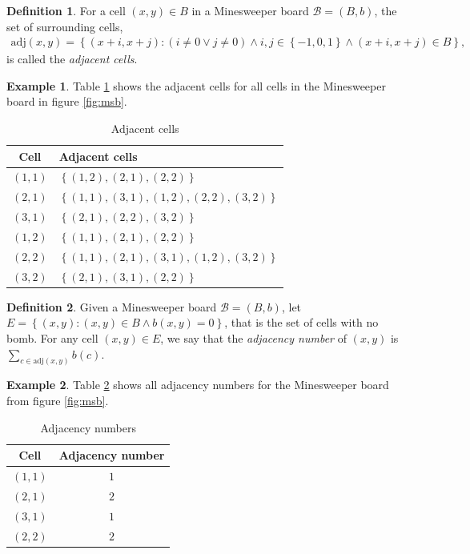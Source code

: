 \documentclass[11pt,a4paper,notitlepage]{article}
\newcommand{\set}[1]{\left\{#1\right\}} %
\theoremstyle{definition}
\newtheorem{example}{Example}[section]
\newtheorem{definition}{Definition}[section]
\begin{document}
\begin{definition}
For a cell $(x,y) \in B$ in a Minesweeper board $\mathcal{B} = (B,b)$, the set of surrounding cells,
\begin{align*}
\text{adj}(x,y) = \set{(x+i,x+j) : (i \neq 0 \vee j \neq 0) \wedge i,j \in \set{-1,0,1} \wedge (x+i,x+j) \in B},
\end{align*}
is called the \emph{adjacent cells}.
\end{definition}
\begin{example}
Table \ref{table:ac} shows the adjacent cells for all cells in the Minesweeper board in figure \ref{fig:msb}.
\begin{table}[H]
\begin{center}
\begin{tabular}{c|l}
Cell & Adjacent cells \\
\hline
$(1,1)$ & $\set{(1,2),(2,1),(2,2)}$ \\
$(2,1)$ & $\set{(1,1),(3,1),(1,2),(2,2),(3,2)}$ \\
$(3,1)$ & $\set{(2,1),(2,2),(3,2)}$ \\
$(1,2)$ & $\set{(1,1),(2,1),(2,2)}$ \\
$(2,2)$ & $\set{(1,1),(2,1),(3,1),(1,2),(3,2)}$ \\
$(3,2)$ & $\set{(2,1),(3,1),(2,2)}$
\end{tabular}
\end{center}
\caption{Adjacent cells}
\label{table:ac}
\end{table}
\end{example}

\begin{definition}
Given a Minesweeper board $\mathcal{B} = (B,b)$, let $E = \set{(x, y) : (x,y) \in B \wedge b(x,y) = 0}$, that is the set of cells with no bomb. For any cell $(x,y) \in E$, we say that the \emph{adjacency number} of $(x,y)$ is $\sum_{c \in \text{adj}(x,y)}b(c)$.
\end{definition}

\begin{example}
Table \ref{table:an} shows all adjacency numbers for the Minesweeper board from figure \ref{fig:msb}.
\begin{table}[H]
\begin{center}
\begin{tabular}{c|c}
Cell & Adjacency number \\
\hline
$(1,1)$ & $1$ \\
$(2,1)$ & $2$ \\
$(3,1)$ & $1$ \\
$(2,2)$ & $2$
\end{tabular}
\end{center}
\caption{Adjacency numbers}
\label{table:an}
\end{table}
\end{example}
\end{document}

